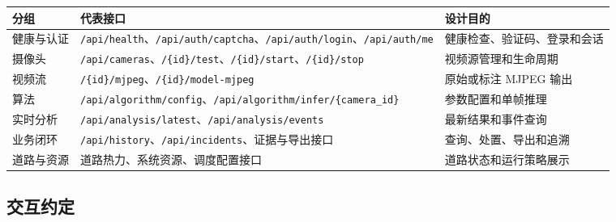 \begin{longtable}[]{@{}
  >{\raggedright\arraybackslash}p{}
  >{\raggedright\arraybackslash}p{}
  >{\raggedright\arraybackslash}p{}@{}}
\toprule\noalign{}
\begin{minipage}[b]{\linewidth}\raggedright
分组
\end{minipage} & \begin{minipage}[b]{\linewidth}\raggedright
代表接口
\end{minipage} & \begin{minipage}[b]{\linewidth}\raggedright
设计目的
\end{minipage} \\
\midrule\noalign{}
\endhead
\bottomrule\noalign{}
\endlastfoot
健康与认证 & \texttt{/\allowbreak{}api/\allowbreak{}health}、\texttt{/\allowbreak{}api/\allowbreak{}auth/\allowbreak{}captcha}、\texttt{/\allowbreak{}api/\allowbreak{}auth/\allowbreak{}login}、\texttt{/\allowbreak{}api/\allowbreak{}auth/\allowbreak{}me} & 健康检查、验证码、登录和会话 \\
摄像头 & \texttt{/\allowbreak{}api/\allowbreak{}cameras}、\texttt{/\allowbreak{}\{id\}/\allowbreak{}test}、\texttt{/\allowbreak{}\{id\}/\allowbreak{}start}、\texttt{/\allowbreak{}\{id\}/\allowbreak{}stop} & 视频源管理和生命周期 \\
视频流 & \texttt{/\allowbreak{}\{id\}/\allowbreak{}mjpeg}、\texttt{/\allowbreak{}\{id\}/\allowbreak{}model-\allowbreak{}mjpeg} & 原始或标注 MJPEG 输出 \\
算法 & \texttt{/\allowbreak{}api/\allowbreak{}algorithm/\allowbreak{}config}、\texttt{/\allowbreak{}api/\allowbreak{}algorithm/\allowbreak{}infer/\allowbreak{}\{camera\_\allowbreak{}id\}} & 参数配置和单帧推理 \\
实时分析 & \texttt{/\allowbreak{}api/\allowbreak{}analysis/\allowbreak{}latest}、\texttt{/\allowbreak{}api/\allowbreak{}analysis/\allowbreak{}events} & 最新结果和事件查询 \\
业务闭环 & \texttt{/\allowbreak{}api/\allowbreak{}history}、\texttt{/\allowbreak{}api/\allowbreak{}incidents}、证据与导出接口 & 查询、处置、导出和追溯 \\
道路与资源 & 道路热力、系统资源、调度配置接口 & 道路状态和运行策略展示 \\
\end{longtable}

\subsection{交互约定}\label{design-ux4ea4ux4e92ux7ea6ux5b9a}

